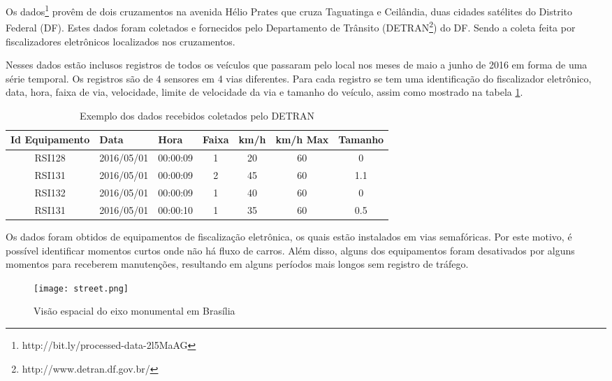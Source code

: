 Os dados\footnote{http://bit.ly/processed-data-2l5MaAG} provêm de dois cruzamentos na avenida Hélio Prates que cruza Taguatinga e Ceilândia, duas cidades satélites do Distrito Federal (DF). Estes dados foram coletados e fornecidos pelo Departamento de Trânsito (\acrfull{DETRAN}\footnote{http://www.detran.df.gov.br/}) do \acrfull{DF}. Sendo a coleta feita por fiscalizadores eletrônicos localizados nos cruzamentos.

Nesses dados estão inclusos registros de todos os veículos que passaram pelo local nos meses de maio a junho de 2016 em forma de uma série temporal. Os registros são de 4 sensores em 4 vias diferentes. Para cada registro se tem uma identificação do fiscalizador eletrônico, data, hora, faixa de via, velocidade, limite de velocidade da via e tamanho do veículo, assim como mostrado na tabela \ref{table:data}.

\begin{table}[h]
    \begin{tabular}{ccccccc}
    \toprule
    \multicolumn{1}{l}{\textbf{Id Equipamento}} & \multicolumn{1}{l}{\textbf{Data}} & \multicolumn{1}{l}{\textbf{Hora}} & \multicolumn{1}{l}{\textbf{Faixa}} & \multicolumn{1}{l}{\textbf{km/h}} & \multicolumn{1}{l}{\textbf{km/h Max}} & \multicolumn{1}{l}{\textbf{Tamanho}} \\ 
    \midrule
    RSI128 & 2016/05/01 & 00:00:09 & 1 & 20 & 60 & 0 \\
    RSI131 & 2016/05/01 & 00:00:09 & 2 & 45 & 60 & 1.1 \\
    RSI132 & 2016/05/01 & 00:00:09 & 1 & 40 & 60 & 0 \\
    RSI131 & 2016/05/01 & 00:00:10 & 1 & 35 & 60 & 0.5 \\ 
    \bottomrule
    \end{tabular}
    \label{table:data}
    \caption{Exemplo dos dados recebidos coletados pelo \acrshort{DETRAN}}
\end{table}

Os dados foram obtidos de equipamentos de fiscalização eletrônica, os quais estão instalados em vias semafóricas. Por este motivo, é possível identificar momentos curtos onde não há fluxo de carros. Além disso, alguns dos equipamentos foram desativados por alguns momentos para receberem manutenções, resultando em alguns períodos mais longos sem registro de tráfego.

\begin{figure}[t]
    \centering
    \texttt{[image: street.png]}
    \label{figure:eixo}
    \caption{Visão espacial do eixo monumental em Brasília}
\end{figure}


